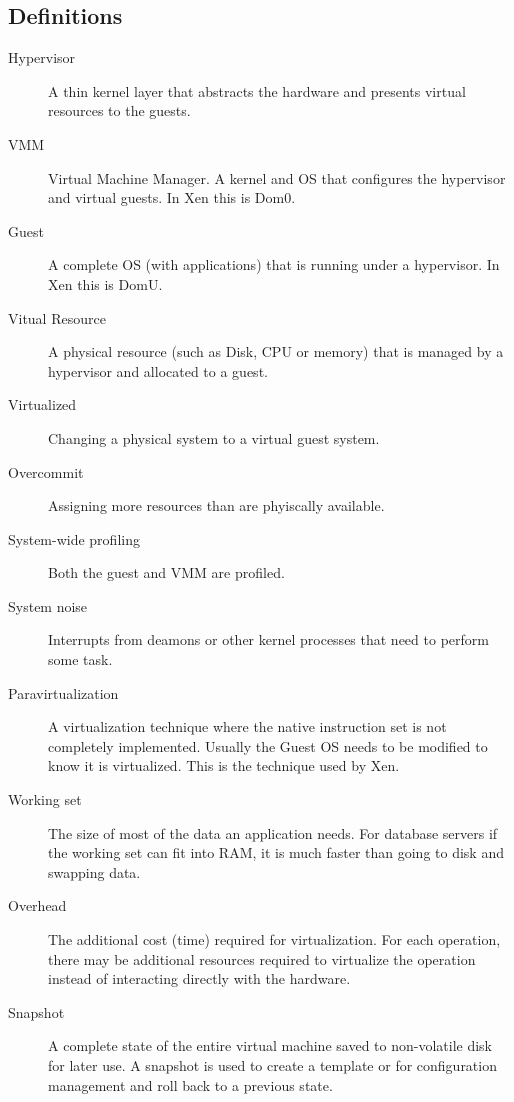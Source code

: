 \subsection{Definitions}
\begin{description}
  \item[Hypervisor] A thin kernel layer that abstracts the hardware and presents virtual resources to the guests.\\
  \item[VMM] Virtual Machine Manager. A kernel and OS that configures the hypervisor and virtual guests.  In Xen this is Dom0.\\
  \item[Guest] A complete OS (with applications) that is running under a hypervisor.  In Xen this is DomU.\\
  \item[Vitual Resource]  A physical resource (such as Disk, CPU or memory) that is managed by a hypervisor and allocated to a guest.\\
  \item[Virtualized] Changing a physical system to a virtual guest system.\\
  \item[Overcommit] Assigning more resources than are phyiscally available.\\
  \item[System-wide profiling] Both the guest and VMM are profiled.\\
  \item[System noise] Interrupts from deamons or other kernel processes that need to perform some task. \cite{tsafrir}\\
  \item[Paravirtualization] A virtualization technique where the native instruction set is not completely implemented.  Usually the Guest OS needs to be modified to know it is virtualized. This is the technique used by Xen. \cite{vmwareMem, du1}
  \item[Working set] The size of most of the data an application needs.  For database servers if the working set can fit into RAM, it is much faster than going to disk and swapping data. 
  \item[Overhead] The additional cost (time) required for virtualization.  For each operation, there may be additional resources required to virtualize the operation instead of interacting directly with the hardware.
  \item[Snapshot] A complete state of the entire virtual machine saved to non-volatile disk for later use.  A snapshot is used to create a template or for configuration management and roll back to a previous state.
\end{description}
